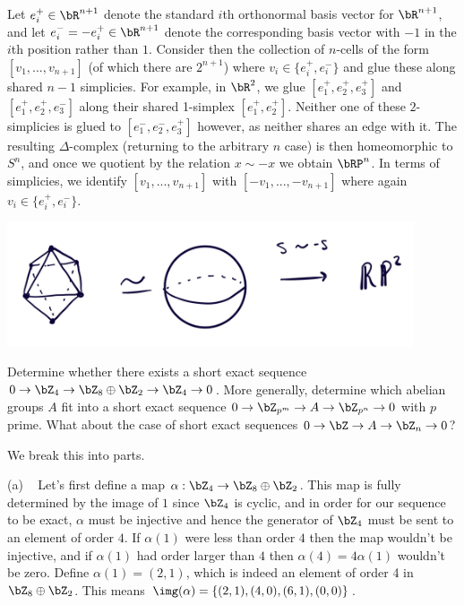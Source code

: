 \begin{homework}[e]
\begin{prf}
    Let $e_i^+ \in \bR^{n+1}$ denote the standard $i$th orthonormal basis vector for $\bR^{n+1}$, and let $e_i^- = -e_i^{+}\in \bR^{n+1}$ denote the corresponding basis vector with $-1$ in the $i$th position rather than $1$. Consider then the collection of $n$-cells of the form $[v_1,...,v_{n+1}]$ (of which there are $2^{n+1}$) where $v_i \in \{e_i^+,e_i^-\}$ and glue these along shared $n-1$ simplicies. For example, in $\bR^2$, we glue $[e_1^+,e_2^+,e_3^+]$ and $[e_1^+,e_2^+,e_3^-]$ along their shared 1-simplex $[e_1^+,e_2^+]$. Neither one of these $2$-simplicies is glued to $[e_1^-,e_2^-,e_3^+]$ however, as neither shares an edge with it. The resulting $\Delta$-complex (returning to the arbitrary $n$ case) is then homeomorphic to $S^n$, and once we quotient by the relation $x \sim -x$ we obtain $\bRP^n$. In terms of simplicies, we identify $[v_1,...,v_{n+1}]$ with $[-v_1,...,-v_{n+1}]$ where again $v_i \in \{e_i^+,e_i^-\}$.
    \begin{center}
      \includegraphics[width=12cm]{figures/hwk7-fig3.png}
      \label{fig:prob2-3}
    \end{center}
  \end{prf}
  \prob[2.1.14] Determine whether there exists a short exact sequence $0 \to \bZ_4 \to \bZ_8 \oplus \bZ_2 \to \bZ_4 \to 0$. More generally, determine which abelian groups $A$ fit into a short exact sequence $0 \to \bZ_{p^m} \to A\to \bZ_{p^n}\to 0$ with $p$ prime. What about the case of short exact sequences $0 \to \bZ\to A\to \bZ_n \to 0$?
  \begin{prf}
    We break this into parts.

    (a) ~ Let's first define a map $\alpha:\bZ_4 \to \bZ_8\oplus \bZ_2$. This map is fully determined by the image of $1$ since $\bZ_4$ is cyclic, and in order for our sequence to be exact, $\alpha$ must be injective and hence the generator of $\bZ_4$ must be sent to an element of order $4$. If $\alpha(1)$ were less than order $4$ then the map wouldn't be injective, and if $\alpha(1)$ had order larger than $4$ then $\alpha(4) = 4\alpha(1)$ wouldn't be zero. Define $\alpha(1) = (2,1)$, which is indeed an element of order 4 in $\bZ_8\oplus \bZ_2$. This means $\img(\alpha) = \{(2,1),(4,0),(6,1),(0,0)\}$.


\end{prf}
\end{homework}
